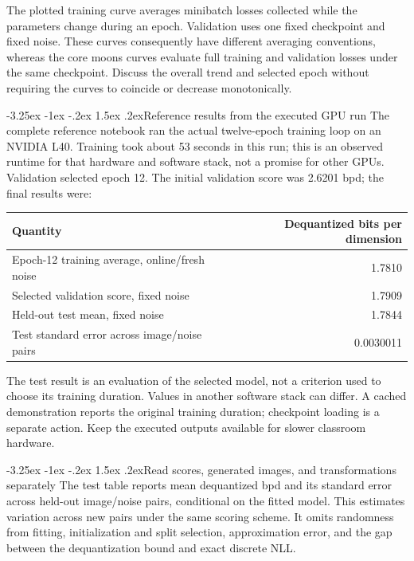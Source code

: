 \documentclass[11pt,a4paper]{article}
\makeatletter
\renewcommand\subsection{\@startsection{subsection}{2}{\z@}%
  {-3.25ex \@plus -1ex \@minus -.2ex}%
  {1.5ex \@plus .2ex}{\normalfont\large}}
\makeatother
\begin{document}
The plotted training curve averages minibatch losses collected while the
parameters change during an epoch. Validation uses one fixed checkpoint and
fixed noise. These curves consequently have different averaging conventions,
whereas the core moons curves evaluate full training and validation losses
under the same checkpoint. Discuss the overall trend and selected epoch
without requiring the curves to coincide or decrease monotonically.

\subsection{Reference results from the executed GPU run}
The complete reference notebook ran the actual twelve-epoch training loop on
an NVIDIA L40. Training took about 53 seconds in this run; this is an observed
runtime for that hardware and software stack, not a promise for other GPUs.
Validation selected epoch 12. The initial validation score was 2.6201 bpd;
the final results were:
\begin{center}
\begin{tabular}{@{}lr@{}}
\toprule
Quantity & Dequantized bits per dimension \\
\midrule
Epoch-12 training average, online/fresh noise & 1.7810 \\
Selected validation score, fixed noise & 1.7909 \\
Held-out test mean, fixed noise & 1.7844 \\
Test standard error across image/noise pairs & 0.0030011 \\
\bottomrule
\end{tabular}
\end{center}
The test result is an evaluation of the selected model, not a criterion used
to choose its training duration. Values in another software stack can differ.
A cached demonstration reports the original training duration; checkpoint
loading is a separate action. Keep the executed outputs available for slower
classroom hardware.

\subsection{Read scores, generated images, and transformations separately}
The test table reports mean dequantized bpd and its standard error across
held-out image/noise pairs, conditional on the fitted model. This estimates
variation across new pairs under the same scoring scheme. It omits randomness
from fitting, initialization and split selection, approximation error, and
the gap between the dequantization bound and exact discrete NLL.
\end{document}
